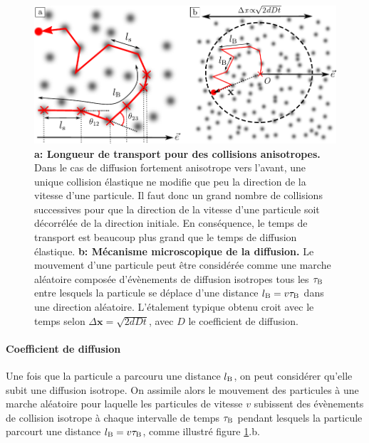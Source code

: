 \begin{figure}
\centering
\includegraphics[width=\textwidth]{Fig/Localisation/diffusion_classique.pdf}
\caption{\textbf{a: Longueur de transport pour des collisions anisotropes.} Dans le cas de diffusion fortement anisotrope vers l'avant, une unique collision élastique ne modifie que peu la direction de la vitesse d'une particule. Il faut donc un grand nombre de collisions successives pour que la direction de la vitesse d'une particule soit décorrélée de la direction initiale. En conséquence, le temps de transport est beaucoup plus grand que le temps de diffusion élastique. \textbf{b: Mécanisme microscopique de la diffusion.} Le mouvement d'une particule peut être considérée comme une marche aléatoire composée d'évènements de diffusion isotropes tous les $\tau_{\mathrm{B}}$ entre lesquels la particule se déplace d'une distance $l_{\mathrm{B}}=v \tau_{\mathrm{B}}$ dans une direction aléatoire. L'étalement typique obtenu croit avec le temps selon $\Delta \mathbf{x} =\sqrt{2dDt}$, avec $D$ le coefficient de diffusion.}
\label{fig:diffusion_classique}
\end{figure}





\paragraph*{Coefficient de diffusion}
Une fois que la particule a parcouru une distance $l_{\mathrm{B}}$, on peut considérer qu'elle subit une diffusion isotrope. On assimile alors le mouvement des particules à une marche aléatoire pour laquelle les particules de vitesse $v$ subissent des évènements de collision isotrope à chaque intervalle de temps $\tau_{\mathrm{B}}$ pendant lesquels la particule parcourt une distance $l_{\mathrm{B}}=v \tau_{\mathrm{B}}$, comme illustré figure \ref{fig:diffusion_classique}.b.

